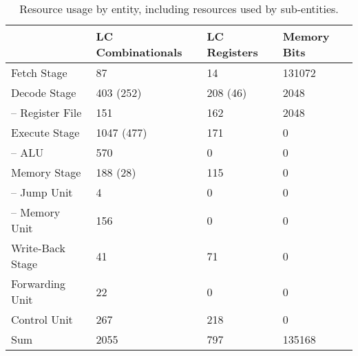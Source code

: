 \begin{table}[htb]
  \centering
  \caption{Resource usage by entity, including resources used by sub-entities.}
  \begin{tabular}{llll}
    \toprule
                         & LC Combinationals & LC Registers & Memory Bits \\
    \midrule
    Fetch Stage          & 87                & 14           & 131072 \\
    Decode Stage         & 403 (252)         & 208 (46)     & 2048 \\
    -- Register File     & 151               & 162          & 2048 \\
    Execute Stage        & 1047 (477)        & 171          & 0 \\
    -- ALU               & 570               & 0            & 0 \\
    Memory Stage         & 188 (28)          & 115          & 0 \\
    -- Jump Unit         & 4                 & 0            & 0 \\
    -- Memory Unit       & 156               & 0            & 0 \\
    Write-Back Stage     & 41                & 71           & 0 \\
    Forwarding Unit      & 22                & 0            & 0 \\
    Control Unit         & 267               & 218          & 0 \\
    \cmidrule{1-4}
    Sum                  & 2055              & 797          & 135168 \\
    \bottomrule
  \end{tabular}
\end{table}

\begin{qa}
\end{qa}
